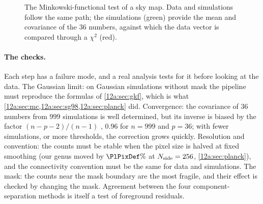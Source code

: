 \begin{figure}[htbp]
\centering
{}
\caption{The Minkowski-functional test of a sky map. Data and simulations follow the same path; the
simulations (green) provide the mean and covariance of the $36$ numbers, against which the data vector is
compared through a $\chi^2$ (red).}
\label{12a:fig:pipeline}
\end{figure}

\paragraph{The checks.} Each step has a failure mode, and a real analysis tests for it before looking at the
data. The Gaussian limit: on Gaussian simulations without mask the pipeline must reproduce the formulas of
\cref{12a:sec:gkf}, which is what \cref{12a:sec:mc,12a:sec:sg98,12a:sec:planck} did. Convergence: the covariance
of $36$ numbers from $999$ simulations is well determined, but its inverse is biased by the factor
$(n-p-2)/(n-1)$ \cite{Hartlap2007}, $0.96$ for $n=999$ and $p=36$; with fewer simulations, or more thresholds, the
correction grows quickly. Resolution and convention: the counts must be stable when the pixel size is halved at
fixed smoothing (our genus moved by $\PlPixDef\%$ at $N_{\rm side}=256$, \cref{12a:sec:planck}), and the connectivity
convention must be the same for data and simulations. The mask: the counts near the mask boundary are the most
fragile, and their effect is checked by changing the mask. Agreement between the four component-separation
methods is itself a test of foreground residuals.

